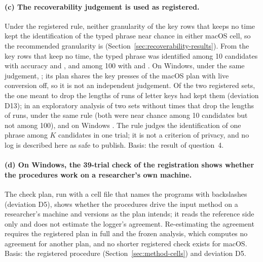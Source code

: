 \paragraph{(c) The recoverability judgement is used as registered.} Under the registered rule, neither granularity of
the key rows that keeps no time kept the identification of the typed phrase near chance in either macOS cell, so the
recommended granularity is  (Section~\ref{sec:recoverability-results}). From the key rows that
keep no time, the typed phrase was identified among 10 candidates with accuracy
 and , and among 100 with
 and . On Windows,
under the same judgement, ; its plan shares the key presses of the macOS plan with live
conversion off, so it is not an independent judgement.
Of the two registered sets, the one meant to drop the lengths of
runs of letter keys had kept them (deviation D13); in an exploratory analysis of two sets without times that drop the
lengths of runs,  under the same rule (both were near chance among 10 candidates but not among 100),
and on Windows . The rule judges the
identification of one phrase among $K$
candidates in one trial; it is not a criterion of privacy, and no log is described here as safe to publish. Basis: the
result of question~4.

\paragraph{(d) On Windows, the 39-trial check of the registration shows whether the procedures work on a researcher's
own machine.} The check plan, run with a cell file that names the programs with backslashes (deviation D5), shows whether
the procedures drive the input method on a researcher's machine and versions as the plan intends; it reads the reference
side only and does not estimate the logger's agreement. Re-estimating the agreement requires the registered plan in full
and the frozen analysis, which computes no agreement for another plan, and no shorter registered check exists for macOS.
Basis: the registered procedure (Section~\ref{sec:method-cells}) and deviation D5.

